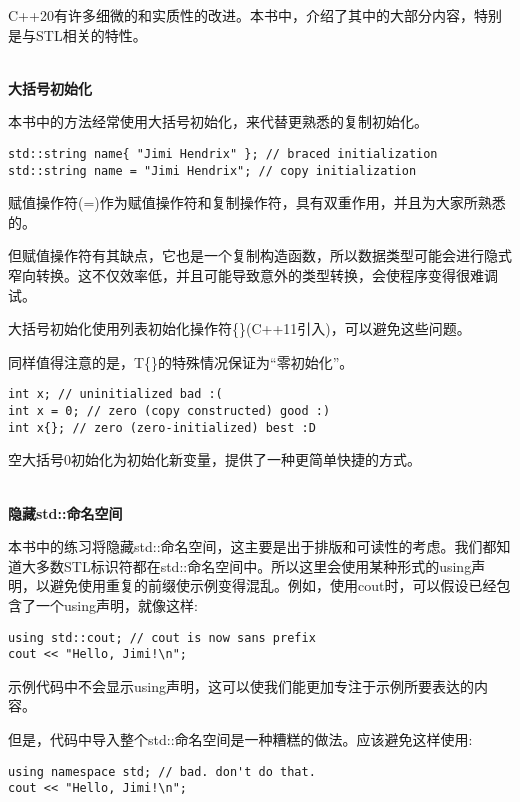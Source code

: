 C++20有许多细微的和实质性的改进。本书中，介绍了其中的大部分内容，特别是与STL相关的特性。

\hspace*{\fill} \\ %
\noindent
\textbf{大括号初始化}

本书中的方法经常使用大括号初始化，来代替更熟悉的复制初始化。

\begin{lstlisting}[style=styleCMake]
std::string name{ "Jimi Hendrix" }; // braced initialization
std::string name = "Jimi Hendrix"; // copy initialization
\end{lstlisting}

赋值操作符(=)作为赋值操作符和复制操作符，具有双重作用，并且为大家所熟悉的。

但赋值操作符有其缺点，它也是一个复制构造函数，所以数据类型可能会进行隐式窄向转换。这不仅效率低，并且可能导致意外的类型转换，会使程序变得很难调试。

大括号初始化使用列表初始化操作符\{\}(C++11引入)，可以避免这些问题。

同样值得注意的是，T\{\}的特殊情况保证为“零初始化”。

\begin{lstlisting}[style=styleCXX]
int x; // uninitialized bad :(
int x = 0; // zero (copy constructed) good :)
int x{}; // zero (zero-initialized) best :D
\end{lstlisting}

空大括号0初始化为初始化新变量，提供了一种更简单快捷的方式。

\hspace*{\fill} \\ %
\noindent
\textbf{隐藏std::命名空间}

本书中的练习将隐藏std::命名空间，这主要是出于排版和可读性的考虑。我们都知道大多数STL标识符都在std::命名空间中。所以这里会使用某种形式的using声明，以避免使用重复的前缀使示例变得混乱。例如，使用cout时，可以假设已经包含了一个using声明，就像这样:

\begin{lstlisting}[style=styleCXX]
using std::cout; // cout is now sans prefix
cout << "Hello, Jimi!\n";
\end{lstlisting}

示例代码中不会显示using声明，这可以使我们能更加专注于示例所要表达的内容。

但是，代码中导入整个std::命名空间是一种糟糕的做法。应该避免这样使用:

\begin{lstlisting}[style=styleCXX]
using namespace std; // bad. don't do that.
cout << "Hello, Jimi!\n";
\end{lstlisting}


